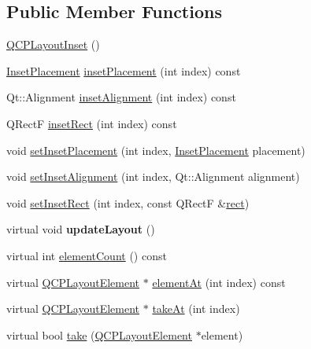 \subsection*{Public Member Functions}
\begin{DoxyCompactItemize}
\item 
\hyperlink{class_q_c_p_layout_inset_a3ad984f3221735374cc5dee14356a7dd}{Q\+C\+P\+Layout\+Inset} ()
\item 
\hyperlink{class_q_c_p_layout_inset_a8b9e17d9a2768293d2a7d72f5e298192}{Inset\+Placement} \hyperlink{class_q_c_p_layout_inset_a6fcbd74ebbc45bfe64c604b2791aa57f}{inset\+Placement} (int index) const
\item 
Qt\+::\+Alignment \hyperlink{class_q_c_p_layout_inset_a5b33b66f0abbb4a7cc2f8aa6c94cf7f8}{inset\+Alignment} (int index) const
\item 
Q\+RectF \hyperlink{class_q_c_p_layout_inset_ab23099a46af17c31f4c40668f13c9de1}{inset\+Rect} (int index) const
\item 
void \hyperlink{class_q_c_p_layout_inset_a63298830744d5d8c5345511c00fd2144}{set\+Inset\+Placement} (int index, \hyperlink{class_q_c_p_layout_inset_a8b9e17d9a2768293d2a7d72f5e298192}{Inset\+Placement} placement)
\item 
void \hyperlink{class_q_c_p_layout_inset_a62882a4f9ad58bb0f53da12fde022abe}{set\+Inset\+Alignment} (int index, Qt\+::\+Alignment alignment)
\item 
void \hyperlink{class_q_c_p_layout_inset_aa487c8378a6f9533567a2e6430099dc3}{set\+Inset\+Rect} (int index, const Q\+RectF \&\hyperlink{class_q_c_p_layout_element_a208effccfe2cca4a0eaf9393e60f2dd4}{rect})
\item 
\hypertarget{class_q_c_p_layout_inset_a7b33fdd51b18e6db7cea9bfb2d263b4a}{}\label{class_q_c_p_layout_inset_a7b33fdd51b18e6db7cea9bfb2d263b4a} 
virtual void {\bfseries update\+Layout} ()
\item 
virtual int \hyperlink{class_q_c_p_layout_inset_a0398918a888fa7974a6776dc47fc5d2e}{element\+Count} () const
\item 
virtual \hyperlink{class_q_c_p_layout_element}{Q\+C\+P\+Layout\+Element} $\ast$ \hyperlink{class_q_c_p_layout_inset_a832e049f0bb32e7db0490a9c904098df}{element\+At} (int index) const
\item 
virtual \hyperlink{class_q_c_p_layout_element}{Q\+C\+P\+Layout\+Element} $\ast$ \hyperlink{class_q_c_p_layout_inset_ad6756a3b507e20496aaf7f5ca16c47d1}{take\+At} (int index)
\item 
virtual bool \hyperlink{class_q_c_p_layout_inset_a9ac707ccff650633b97f52dd5cddcf49}{take} (\hyperlink{class_q_c_p_layout_element}{Q\+C\+P\+Layout\+Element} $\ast$element)

\end{DoxyCompactItemize}
